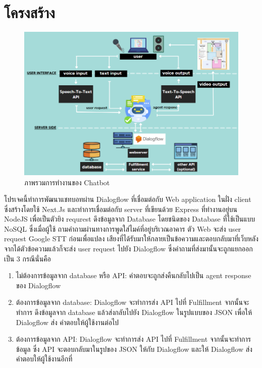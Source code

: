 \section{โครงสร้าง}
\begin{figure}[hbt!]
  \begin{center}
    \includegraphics[width=\textwidth,keepaspectratio]{pic/overview.png}
  \end{center}
  \caption{ภาพรวมการทำงานของ Chatbot}
  \label{fig:overview}
\end{figure}
โปรเจคนี้ทำการพัฒนาแชทบอทผ่าน Dialogflow ที่เชื่อมต่อกับ Web application ในฝั่ง client ซึ่งสร้างโดยใช้ Next.Js และทำการเชื่อมต่อกับ
server ที่เขียนด้วย Express ที่ทำงานอยู่บน NodeJS เพื่อเป็นตัวยิง requrest ดึงข้อมูลจาก Database โดยชนิดของ Database ที่ใช้เป็นแบบ NoSQL ซึ่งเมื่อผู้ใช้
ถามคำถามผ่านทางการพูดใส่ไมค์ที่อยู่บริเวณอาคาร ตัว Web จะส่ง user request Google STT ก่อนเพื่อแปลง
เสียงที่ได้รับมาให้กลายเป็นข้อความและตอบกลับมาที่เว็บหลังจากได้ตัวข้อความแล้วก็จะส่ง user request ไปยัง
Dialogflow ซึ่งคำถามที่ส่งมานั้นจะถูกแยกออกเป็น 3 กรณีนั่นคือ

\begin{enumerate}
  \item ไม่ต้องการข้อมูลจาก database หรือ API: คำตอบจะถูกส่งคืนกลับไปเป็น agent response
        ของ Dialogflow
  \item ต้องการข้อมูลจาก database: Dialogflow จะทำการส่ง API ไปที่ Fulfillment จากนั้นจะทำการ
        ดึงข้อมูลจาก database แล้วส่งกลับไปยัง Dialogflow ในรูปแบบของ JSON เพื่อให้ Dialogflow ส่ง
        คำตอบให้ผู้ใช้งานต่อไป
  \item ต้องการข้อมูลจาก API: Dialogflow จะทำการส่ง API ไปที่ Fulfillment จากนั้นจะทำการข้อมูล
        ซึ่ง API จะตอบกลับมาในรูปของ JSON ให้กับ Dialogflow และให้ Dialogflow ส่งคำตอบให้ผู้ใช้งานอีกที่
\end{enumerate}

